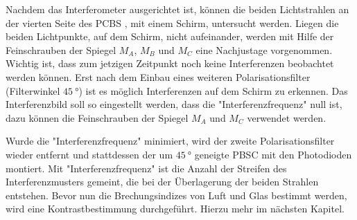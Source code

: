 Nachdem das Interferometer ausgerichtet ist, können die beiden Lichtstrahlen an der vierten Seite des PCBS
, mit einem Schirm, untersucht werden.
Liegen die beiden Lichtpunkte, auf dem Schirm, nicht aufeinander, werden mit Hilfe der
Feinschrauben der Spiegel $M_A$, $M_B$ und $M_C$ eine Nachjustage vorgenommen. Wichtig ist, dass zum
jetzigen Zeitpunkt noch keine Interferenzen beobachtet werden können. Erst nach
dem Einbau eines weiteren Polarisationsfilter (Filterwinkel $\SI{45}{\degree}$)
ist es möglich Interferenzen auf dem Schirm zu erkennen.
Das Interferenzbild soll so eingestellt werden, dass die
"Interferenzfrequenz" null ist, dazu können die Feinschrauben der Spiegel
$M_A$ und $M_C$ verwendet werden.

Wurde die "Interferenzfrequenz" minimiert, wird der zweite Polarisationsfilter wieder
entfernt und stattdessen der um $\SI{45}{\degree}$ geneigte PBSC mit den Photodioden
montiert. Mit "Interferenzfrequenz" ist die Anzahl der Streifen des Interferenzmusters
gemeint, die bei der Überlagerung der beiden Strahlen entstehen.
Bevor nun die Brechungsindizes von Luft und Glas bestimmt werden, wird eine
Kontrastbestimmung durchgeführt. Hierzu mehr im nächsten Kapitel.


